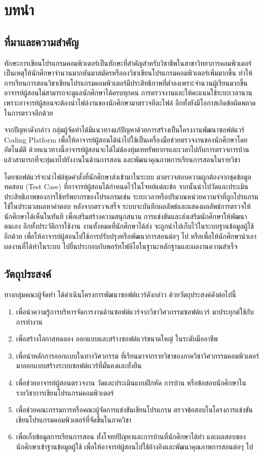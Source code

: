 \documentclass[12pt,one side,openright,a4paper]{cpe-thesis-th}
\newcommand{\thaijustify}[1]{%
  \par\hspace{30pt}\justifying
  #1
}
\begin{document}
\chapter{บทนำ}
\section{ที่มาและความสำคัญ}
\thaijustify{
  ทักษะการเขียนโปรแกรมคอมพิวเตอร์เป็นทักษะที่สำคัญสำหรับวิชาชีพในสาขาวิทยาการคอมพิวเตอร์ เป็นเหตุให้นักศึกษาจำนวนมากหันมาสมัครหรือลงวิชาเขียนโปรแกรมคอมพิวเตอร์เพิ่มมากขึ้น ทำให้การเรียนการสอนวิชาเขียนโปรแกรมคอมพิวเตอร์มีประสิทธิภาพที่ต่ำลงเพราะจำนวนผู้เรียนมากขึ้น อาจารย์ผู้สอนไม่สามารถจะดูแลนักศึกษาได้ครบทุกคน การตรวจงานและให้คะแนนใช้ระยะเวลานาน เพราะอาจารย์ผู้สอนจะต้องนำไฟล์งานของนักศึกษามาตรวจทีละไฟล์ อีกทั้งยังมีโอกาสเกิดข้อผิดพลาดในการตรวจอีกด้วย
}
\thaijustify{
  จากปัญหาดังกล่าว กลุ่มผู้จัดทำได้มีแนวทางแก้ปัญหาด้วยการสร้างเป็นโครงงานพัฒนาซอฟต์แวร์ Coding Platform เพื่อให้อาจารย์ผู้สอนได้นำไปใช้เป็นเครื่องมือช่วยตรวจงานของนักศึกษาโดยอัตโนมัติ ด้วยแนวทางนี้อาจารย์ผู้สอนจะได้ไม่ต้องทุ่มเททรัพยากรและเวลาไปกับการตรวจการบ้าน แล้วสามารถที่จะทุ่มเทไปยังงานในด้านการสอน และพัฒนาคุณภาพการเรียนการสอนในรายวิชา
}
\thaijustify{
  โดยซอฟต์แวร์จะนำไฟล์ชุดคำสั่งที่นักศึกษาส่งเข้ามาในระบบ มาตรวจสอบความถูกต้องจากชุดข้อมูลทดสอบ (Test Case) ที่อาจารย์ผู้สอนได้กำหนดไว้ในโจทย์แต่ละข้อ จากนั้นนำไปวัดและประเมินประสิทธิภาพของการใช้ทรัพยากรของโปรแกรมเช่น ระยะเวลาหรือปริมาณหน่วยความจำที่ถูกโปรแกรมใช้ในประมวลผลหาคำตอบ หลังจากตรวจเสร็จ ระบบจะบันทึกผลลัพธ์และแสดงผลลัพธ์การตรวจให้นักศึกษาได้เห็นในทันที เพื่อเสริมสร้างความสนุกสนาน การแข่งขันและส่งเสริมนักศึกษาให้พัฒนาตนเอง อีกทั้งประวัติการใช้งาน งานทั้งหมดที่นักศึกษาได้ส่ง จะถูกนำไปเก็บไว้ในระบบฐานข้อมูลผู้ใช้อีกด้วย เพื่อให้อาจารย์ผู้สอนไปใช้การปรับปรุงหรือพัฒนาการสอนต่อๆ ไป หรือเพื่อให้นักศึกษานำเอาผลงานที่ได้ทำในระบบ ไปยื่นประกอบกับพอร์ทโฟลิโอในฐานะหลักฐานและผลงานความสำเร็จ
}

\section{วัตถุประสงค์}
ทางกลุ่มคณะผู้จัดทำ ได้ดำเนินโครงการพัฒนาซอฟต์เเวร์ดังกล่าว ด้วยวัตถุประสงค์ดังต่อไปนี้
\begin{enumerate}
  \item เพื่อนำความรู้การบริหารจัดการงานด้านซอฟต์แวร์จากวิชาวิศวกรรมซอฟต์เเวร์ มาประยุกต์ใช้กับการทำงาน
  \item เพื่อสร้างโอกาสทดลอง ออกแบบและสร้างซอฟต์แวร์ขนาดใหญ่ ในระดับมืออาชีพ
  \item เพื่อนำหลักการออกเเบบในทางวิศวกรรม ที่เรียนมาจากรายวิชาของภาควิชาวิศวกรรมคอมพิวเตอร์ มาออกเเบบสร้างระบบซอฟต์เเวร์ที่มั่นคงและยั่งยืน
  \item เพื่อช่วยอาจารย์ผู้สอนตรวจงาน วัดและประเมินแบบฝึกหัด การบ้าน หรือข้อสอบนักศึกษาในรายวิชาการเขียนโปรแกรมคอมพิวเตอร์
  \item เพื่อช่วยคณะกรรมการหรือคณะผู้จัดการแข่งขันเขียนโปรแกรม ตรวจข้อสอบในโครงการแข่งขันเขียนโปรแกรมคอมพิวเตอร์ที่จัดขึ้นในภาควิชา
  \item เพื่อเก็บข้อมูลการเรียนการสอน ทั้งโจทย์ปัญหาและการบ้านที่นักศึกษาได้ทำ และผลสอบของนักศึกษาเข้าฐานข้อมูลผู้ใช้ เพื่อให้อาจารย์ผู้สอนไปใช้อ้างอิงและพัฒนาคุณภาพการสอนต่อๆ ไป
\end{enumerate}
\end{document}
